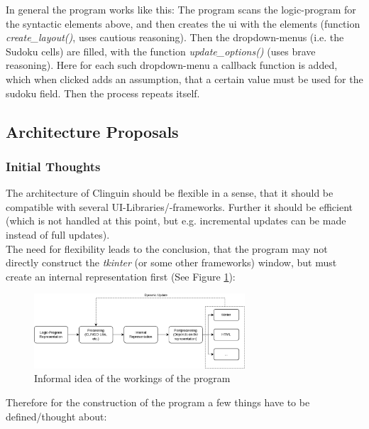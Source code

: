 \documentclass[12pt,a4paper]{article}
\newcommand{\<}[1]{\guilsinglleft}
\renewcommand{\>}[1]{\guilsinglright}
\begin{document}
\noindent In general the program works like this: The program scans the logic-program for the syntactic elements above, and then creates the ui with the elements (function \textit{create\_layout()}, uses cautious reasoning). Then the dropdown-menus (i.e. the Sudoku cells) are filled, with the function \textit{update\_options()} (uses brave reasoning). Here for each such dropdown-menu a callback function is added, which when clicked adds an assumption, that a certain value must be used for the sudoku field. Then the process repeats itself.

\subsection{Architecture Proposals}


\subsubsection{Initial Thoughts}

\noindent The architecture of Clinguin should be flexible in a sense, that it should be compatible with several UI-Libraries/-frameworks. Further it should be efficient (which is not handled at this point, but e.g. incremental updates can be made instead of full updates).\\
The need for flexibility leads to the conclusion, that the program may not directly construct the \textit{tkinter} (or some other frameworks) window, but must create an internal representation first (See Figure \ref{fig:arch-overview}):


\begin{figure}[ht]
    \begin{center}
    \includegraphics[width=0.7\textwidth]{imgs/overview.png}
    \caption{Informal idea of the workings of the program}
    \label{fig:arch-overview}
    \end{center}
\end{figure}

\noindent Therefore for the construction of the program a few things have to be defined/thought about:
 
\end{document}
